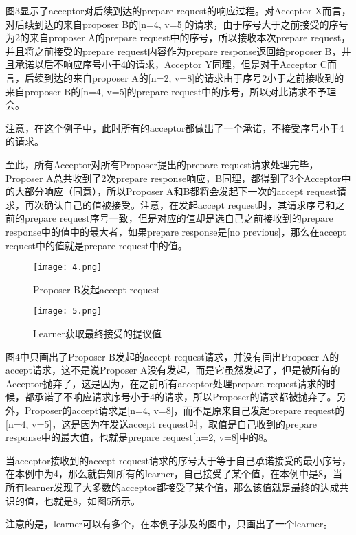 \documentclass{article}
\begin{document}
图3显示了acceptor对后续到达的prepare request的响应过程。对Acceptor X而言，对后续到达的来自proposer B的[n=4, v=5]的请求，由于序号大于之前接受的序号为2的来自proposer A的prepare request中的序号，所以接收本次prepare request，并且将之前接受的prepare request内容作为prepare response返回给proposer B，并且承诺以后不响应序号小于4的请求，Acceptor Y同理，但是对于Acceptor C而言，后续到达的来自proposer A的[n=2, v=8]的请求由于序号2小于之前接收到的来自proposer B的[n=4, v=5]的prepare request中的序号，所以对此请求不予理会。

注意，在这个例子中，此时所有的acceptor都做出了一个承诺，不接受序号小于4的请求。

至此，所有Acceptor对所有Proposer提出的prepare request请求处理完毕，Proposer A总共收到了2次prepare response响应，B同理，都得到了3个Acceptor中的大部分响应（同意），所以Proposer A和B都将会发起下一次的accept request请求，再次确认自己的值被接受。注意，在发起accept request时，其请求序号和之前的prepare request序号一致，但是对应的值却是选自己之前接收到的prepare response中的值中的最大者，如果prepare response是[no previous]，那么在accept request中的值就是prepare request中的值。


\begin{figure}[ht]
	\centering
	\texttt{[image: 4.png]}
	\caption{Proposer B发起accept request}
	\label{fig:label}
\end{figure}

\begin{figure}[ht]
	\centering
	\texttt{[image: 5.png]}
	\caption{Learner获取最终接受的提议值}
	\label{fig:label}
\end{figure}

图4中只画出了Proposer B发起的accept request请求，并没有画出Proposer A的accept请求，这不是说Proposer A没有发起，而是它虽然发起了，但是被所有的Acceptor抛弃了，这是因为，在之前所有acceptor处理prepare request请求的时候，都承诺了不响应请求序号小于4的请求，所以Proposer的请求都被抛弃了。另外，Proposer的accept请求是[n=4, v=8]，而不是原来自己发起prepare request的[n=4, v=5]，这是因为在发送accept request时，取值是自己收到的prepare response中的最大值，也就是prepare request[n=2, v=8]中的8。

当acceptor接收到的accept request请求的序号大于等于自己承诺接受的最小序号，在本例中为4，那么就告知所有的learner，自己接受了某个值，在本例中是8，当所有learner发现了大多数的acceptor都接受了某个值，那么该值就是最终的达成共识的值，也就是8，如图5所示。

注意的是，learner可以有多个，在本例子涉及的图中，只画出了一个learner。
\end{document}
